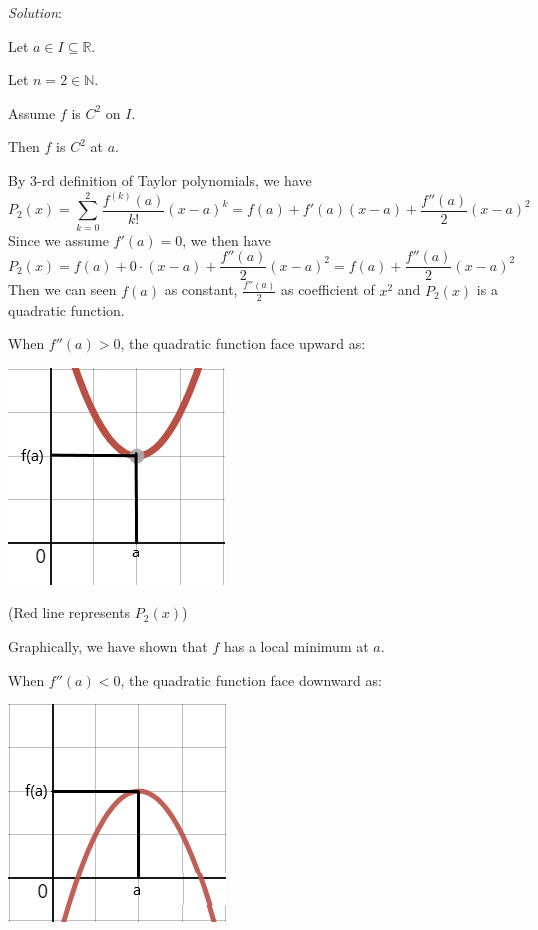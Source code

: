 \documentclass[12pt]{exam}
\newcommand{\R}{\mathbb{R}}
\newcommand{\N}{\mathbb{N}}
\begin{document}
\begin{enumerate}
\begin{enumerate}
			\emph{Solution}:
			
			Let $a \in I\subseteq\R$.
			
			Let $n=2\in\N$.
			
			Assume $f$ is $C^2$ on $I$.
			
			Then $f$ is $C^2$ at $a$.
			
			By 3-rd definition of Taylor polynomials, we have
			$$
			    P_2(x)=\sum_{k=0}^2 \frac{f^{(k)}(a)}{k!}(x-a)^k=f(a)+f'(a)(x-a)+\frac{f''(a)}{2}(x-a)^2
			$$
			Since we assume $f'(a) = 0$, we then have
			$$
			    P_2(x)=f(a)+0\cdot(x-a)+\frac{f''(a)}{2}(x-a)^2=f(a)+\frac{f''(a)}{2}(x-a)^2
			$$
			Then we can seen $f(a)$ as constant, $\frac{f''(a)}{2}$ as coefficient of $x^2$ and $P_2(x)$ is a quadratic function.
			
			When $f''(a)>0$, the quadratic function face upward as:
			\begin{center}
			    \includegraphics[scale=0.75]{Upward}
			    
			    (Red line represents $P_2(x)$)
			\end{center}
			Graphically, we have shown that $f$ has a local minimum at $a$.
			
			\newpage
			
			When $f''(a)<0$, the quadratic function face downward as:
			\begin{center}
			    \includegraphics[scale=0.75]{Downward}
			    

\end{center}
\end{enumerate}
\end{enumerate}
\end{document}
